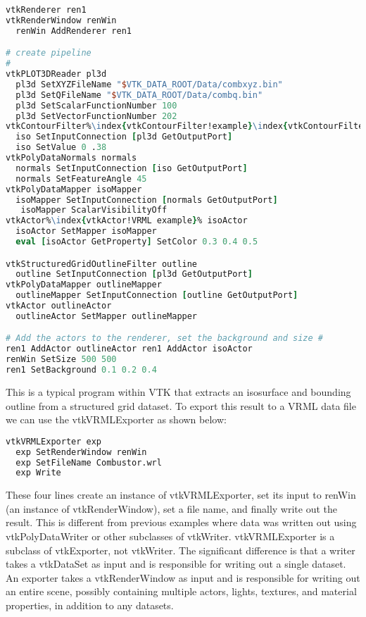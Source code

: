 \begin{lstlisting}[language=TCL, caption={}, numbers=none, frame=none, escapechar=\%]
vtkRenderer ren1
vtkRenderWindow renWin
  renWin AddRenderer ren1

# create pipeline
#
vtkPLOT3DReader pl3d
  pl3d SetXYZFileName "$VTK_DATA_ROOT/Data/combxyz.bin"
  pl3d SetQFileName "$VTK_DATA_ROOT/Data/combq.bin"
  pl3d SetScalarFunctionNumber 100
  pl3d SetVectorFunctionNumber 202
vtkContourFilter%\index{vtkContourFilter!example}\index{vtkContourFilter!VRML example}% iso
  iso SetInputConnection [pl3d GetOutputPort]
  iso SetValue 0 .38
vtkPolyDataNormals normals
  normals SetInputConnection [iso GetOutputPort]
  normals SetFeatureAngle 45
vtkPolyDataMapper isoMapper
  isoMapper SetInputConnection [normals GetOutputPort]
   isoMapper ScalarVisibilityOff
vtkActor%\index{vtkActor!VRML example}% isoActor
  isoActor SetMapper isoMapper
  eval [isoActor GetProperty] SetColor 0.3 0.4 0.5

vtkStructuredGridOutlineFilter outline
  outline SetInputConnection [pl3d GetOutputPort]
vtkPolyDataMapper outlineMapper
  outlineMapper SetInputConnection [outline GetOutputPort]
vtkActor outlineActor
  outlineActor SetMapper outlineMapper

# Add the actors to the renderer, set the background and size #
ren1 AddActor outlineActor ren1 AddActor isoActor
renWin SetSize 500 500
ren1 SetBackground 0.1 0.2 0.4
\end{lstlisting}

This is a typical program within VTK that extracts an isosurface and bounding outline from a structured grid dataset. To export this result to a VRML data file we can use the vtkVRMLExporter as shown below:

\begin{lstlisting}[language=TCL, caption={}, numbers=none, frame=none]
vtkVRMLExporter exp
  exp SetRenderWindow renWin
  exp SetFileName Combustor.wrl
  exp Write
\end{lstlisting}

These four lines create an instance of vtkVRMLExporter, set its input to renWin (an instance of vtkRenderWindow), set a file name, and finally write out the result. This is different from previous examples where data was written out using vtkPolyDataWriter or other subclasses of vtkWriter. vtkVRMLExporter is a subclass of vtkExporter, not vtkWriter. The significant difference is that a writer takes a vtkDataSet as input and is responsible for writing out a single dataset. An exporter takes a vtkRenderWindow as input and is responsible for writing out an entire scene, possibly containing multiple actors, lights, textures, and material properties, in addition to any datasets.

